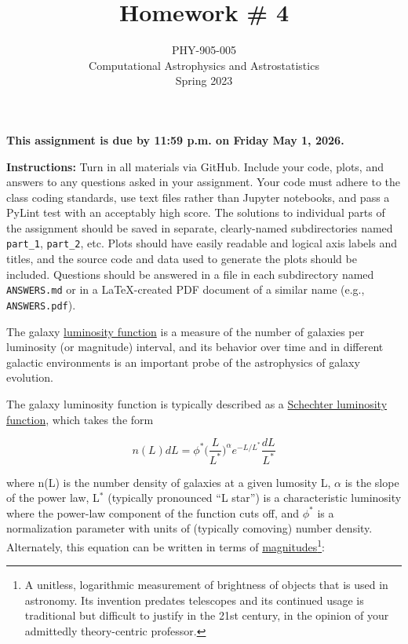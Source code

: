 \documentclass[10pt]{article}
\title{Homework \# 4}
\author{PHY-905-005\\Computational Astrophysics and
  Astrostatistics\\Spring 2023}
\date{} %
\begin{document}
 
\maketitle


\vspace{-5mm}

\centerline{ {\large
\textbf{This assignment is due by 11:59 p.m. on Friday May 1,
  2026.} } }

\vspace{5mm}

\noindent
\textbf{Instructions:}
Turn in all materials via GitHub.  Include your code, plots, and
answers to any questions asked in your assignment.  Your code must
adhere to the class coding standards, use text files rather than
Jupyter notebooks, and pass a PyLint test with an acceptably high score.
The solutions to individual parts of the
assignment should be saved in separate, clearly-named subdirectories
named \texttt{part\_1}, \texttt{part\_2}, etc.  Plots should have
easily readable and logical axis labels and titles, and the source
code and data used to generate the plots should be included.
Questions should be answered in a file in each subdirectory named
\texttt{ANSWERS.md} or in a \LaTeX-created PDF document of a similar
name (e.g., \texttt{ANSWERS.pdf}).


\vspace{5mm}

  The galaxy
\href{https://en.wikipedia.org/wiki/Luminosity_function_(astronomy)}{luminosity
function} is a measure of the number of galaxies per luminosity (or
magnitude) interval, and its behavior over time and in different
galactic environments is an important probe of the astrophysics of
galaxy evolution.

The galaxy luminosity function is typically described as a \href{https://ui.adsabs.harvard.edu/abs/1976ApJ...203..297S}{Schechter luminosity function}, which takes the form

\begin{equation}
n(L)dL = \phi^* \big(\frac{L}{L^*}\big)^\alpha e^{-L/L^*}\frac{dL}{L^*}
\end{equation}

where n(L) is the number density of galaxies at a given
lumosity L, $\alpha$ is the slope of the power law,  L$^*$ (typically pronounced ``L star'') is a characteristic
luminosity where the power-law component of the function cuts off, and
$\phi^*$ is a normalization parameter with units of (typically comoving) number density.
Alternately, this equation can be written in terms of
\href{https://en.wikipedia.org/wiki/Magnitude_(astronomy)}{magnitudes}\footnote{A
unitless, logarithmic measurement of brightness of objects that is used in
astronomy.  Its invention predates telescopes and its continued usage is
traditional but difficult to justify in the 21st century, in the
opinion of your admittedly theory-centric professor.}:
\end{document}
